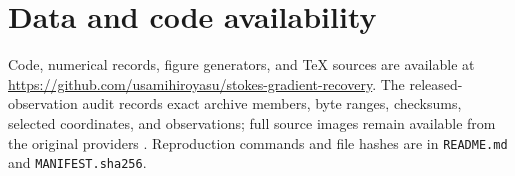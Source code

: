 \section*{Data and code availability}
Code, numerical records, figure generators, and TeX sources are available at \url{https://github.com/usamihiroyasu/stokes-gradient-recovery}. The released-observation audit records exact archive members, byte ranges, checksums, selected coordinates, and observations; full source images remain available from the original providers \cite{ba,polarns}. Reproduction commands and file hashes are in \nolinkurl{README.md} and \nolinkurl{MANIFEST.sha256}.
